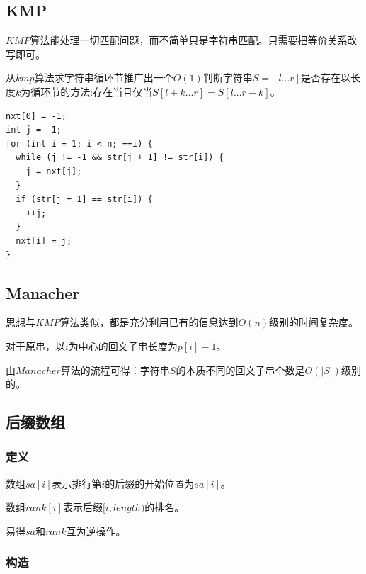 \documentclass[11pt]{article}
\begin{document}
\subsection{KMP}
\label{sec-3-1}

\(KMP\)算法能处理一切匹配问题，而不简单只是字符串匹配。只需要把等价关系改写即可。

从\(kmp\)算法求字符串循环节推广出一个\(O(1)\)判断字符串\(S=[l...r]\)是否存在以长度\(k\)为循环节的方法:存在当且仅当\(S[l+k...r]=S[l...r-k]\)。

\begin{verbatim}
nxt[0] = -1;
int j = -1;
for (int i = 1; i < n; ++i) {
  while (j != -1 && str[j + 1] != str[i]) {
    j = nxt[j];
  }
  if (str[j + 1] == str[i]) {
    ++j;
  }
  nxt[i] = j;
}
\end{verbatim}
\subsection{Manacher}
\label{sec-3-2}

思想与\(KMP\)算法类似，都是充分利用已有的信息达到\(O(n)\)级别的时间复杂度。

对于原串，以\(i\)为中心的回文子串长度为\(p[i]-1\)。

由\(Manacher\)算法的流程可得：字符串\(S\)的本质不同的回文子串个数是\(O(|S|)\)级别的。

\subsection{后缀数组}
\label{sec-3-3}
\subsubsection{定义}
\label{sec-3-3-1}

数组\(sa[i]\)表示排行第\(i\)的后缀的开始位置为\(sa[i]\)。

数组\(rank[i]\)表示后缀\([i,length)\)的排名。

易得\(sa\)和\(rank\)互为逆操作。

\subsubsection{构造}
\label{sec-3-3-2}
\end{document}
